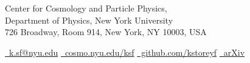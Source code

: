 \setlength{\cvlabelwidth}{7em} %


\vspace{1ex}


\noindent Center for Cosmology and Particle Physics, \\
Department of Physics, New York University \\ 726 Broadway, Room 914, New York, NY 10003, USA

\vspace{1ex}

\noindent\href{mailto:k.sf@nyu.edu}{\faEnvelope ~k.sf@nyu.edu} \hspace{1em}
\href{https://cosmo.nyu.edu/ksf}{\faWifi ~cosmo.nyu.edu/ksf} \hspace{1em}
\href{https://github.com/kstoreyf}{\faGithub ~github.com/kstoreyf} \hspace{1em}
\href{https://arxiv.org/search/?query=Storey-Fisher\%2C+Kate&searchtype=all&abstracts=show&order=-announced_date_first&size=50}{\faFileText ~arXiv}

\vspace{2ex}